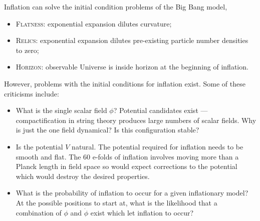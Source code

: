 Inflation can solve the initial condition problems of the Big Bang model, \ie{}
%
\begin{itemize}
	\item \textsc{Flatness}: exponential expansion dilutes curvature;
	\item \textsc{Relics}: exponential expansion dilutes pre-existing particle number densities to zero;
	\item \textsc{Horizon}: observable Universe is inside horizon at the beginning of inflation.
\end{itemize}
%
However, problems with the initial conditions for inflation exist.
Some of these criticisms include:
%
\begin{itemize}
	\item What is the single scalar field \({\phi}\)? Potential candidates exist --- compactification in string theory produces large numbers of scalar fields.
	      Why is just the one field dynamical? Is this configuration stable?

	\item Is the potential \(V\) natural.
	      The potential required for inflation needs to be smooth and flat.
	      The \(\num{60}\) e-folds of inflation involves moving more than a Planck length in field space so would expect corrections to the potential which would destroy the desired properties.

	\item What is the probability of inflation to occur for a given inflationary model? At the possible positions to start at, what is the likelihood that a combination of \({\phi}\) and \(\dot{\phi}\) exist which let inflation to occur?
\end{itemize}
